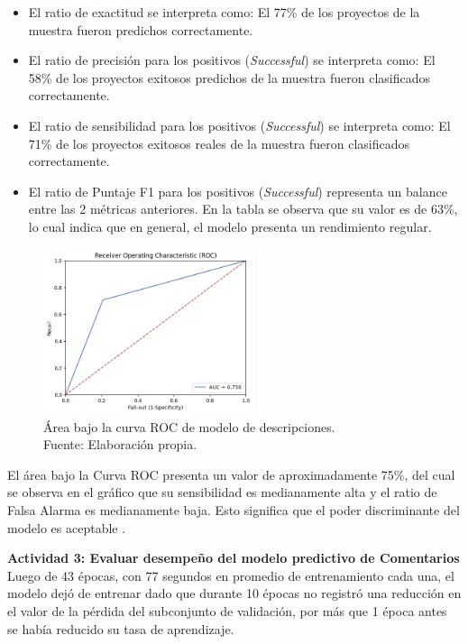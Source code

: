 \begin{itemize}
	\item El ratio de exactitud se interpreta como: El 77\% de los proyectos de la muestra fueron predichos correctamente.
	\item El ratio de precisión para los positivos (\textit{Successful}) se interpreta como: El 58\% de los proyectos exitosos predichos de la muestra fueron clasificados correctamente. 
	\item El ratio de sensibilidad para los positivos (\textit{Successful}) se interpreta como: El 71\% de los proyectos exitosos reales de la muestra fueron clasificados correctamente.
	\item El ratio de Puntaje F1 para los positivos (\textit{Successful}) representa un balance entre las 2 métricas anteriores. En la tabla se observa que su valor es de 63\%, lo cual indica que en general, el modelo presenta un rendimiento regular.
\end{itemize}

\begin{figure}[!ht]
	\begin{center}
		\includegraphics[width=0.55\textwidth]{5/figures/description_auc.png}
		\caption[Área bajo la curva ROC de modelo de descripciones]{Área bajo la curva ROC de modelo de descripciones.\\
		Fuente: Elaboración propia.}
		\label{5:fig6}
	\end{center}
\end{figure}

El área bajo la Curva ROC presenta un valor de aproximadamente 75\%, del cual se observa en el gráfico que su sensibilidad es medianamente alta y el ratio de Falsa Alarma es medianamente baja. Esto significa que el poder discriminante del modelo es aceptable \parencite{bk_britos2006datamining}.

\textbf{Actividad 3: Evaluar desempeño del modelo predictivo de Comentarios}
\\
Luego de 43 épocas, con 77 segundos en promedio de entrenamiento cada una, el modelo dejó de entrenar dado que durante 10 épocas no registró una reducción en el valor de la pérdida del subconjunto de validación, por más que 1 época antes se había reducido su tasa de aprendizaje.

